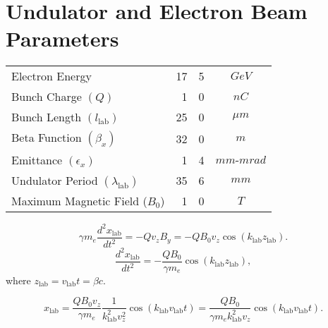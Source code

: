\documentclass[11pt,oneside]{article}
\begin{document}
\section{Undulator and Electron Beam Parameters}

\vspace{5mm}
\begin{center}
\begin{tabular}{|l|r@{.}l|c|}
 \hline
  Electron Energy                           & 17&5  & $GeV$            \\
  Bunch Charge $(Q)$                        &  1&0  & $nC$             \\
  Bunch Length $(l_{\text{lab}})$           & 25&0  & $\mu m$          \\
  Beta Function $( \beta_{x} )$             & 32&0  & $m$              \\
  Emittance $( \epsilon_{x} )$              &  1&4  & $mm\text{-}mrad$ \\
  Undulator Period $(\lambda_{\text{lab}})$ & 35&6  & $mm$             \\
  Maximum Magnetic Field ($B_{0}$)          &  1&0  & $T$              \\
 \hline
\end{tabular}
\end{center}

\begin{equation}
  \gamma m_{e} \frac{d^{2} x_{\text{lab}}}{dt^{2}}
= - Q v_{z} B_{y}
= - Q B_{0} v_{z} \cos \left( k_{\text{lab}} z_{\text{lab}} \right) .
\end{equation}
\begin{equation}
    \frac{d^{2} x_{\text{lab}}}{dt^{2}}
= - \frac{Q B_{0}}{\gamma m_{e}}
    \cos \left( k_{\text{lab}} z_{\text{lab}} \right) ,
\end{equation}
where $z_{\text{lab}} = v_{\text{lab}} t = \beta c$.

\begin{equation}
  x_{\text{lab}}
= \frac{Q B_{0} v_{z}}{\gamma m_{e}} \frac{1}{k_{\text{lab}}^{2} v_{z}^{2}}
  \cos \left( k_{\text{lab}} v_{\text{lab}} t \right) 
= \frac{Q B_{0}}{\gamma m_{e} k_{\text{lab}}^{2} v_{z}}
  \cos \left( k_{\text{lab}} v_{\text{lab}} t \right) .
\end{equation}
\end{document}
